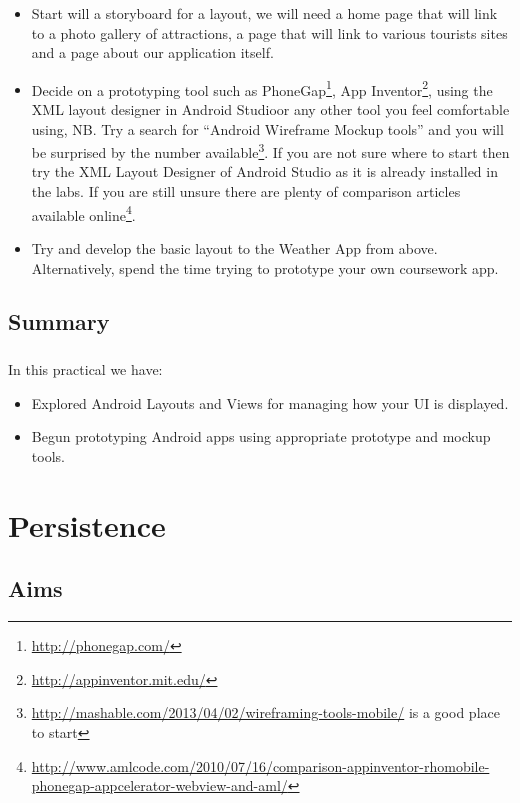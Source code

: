 \documentclass[12pt, a4paper, twoside]{book}
\begin{document}
\begin{itemize}
\item Start will a storyboard for a layout, we will need a home page that will link to a photo gallery of attractions, a page that will link to various tourists sites and a page about our application itself.
\item Decide on a prototyping tool such as PhoneGap\footnote{\url{http://phonegap.com/}}, App Inventor\footnote{\url{http://appinventor.mit.edu/}}, using the XML layout designer in Android Studioor any other tool you feel comfortable using, NB. Try a search for ``Android Wireframe Mockup tools'' and you will be surprised by the number available\footnote{\url{http://mashable.com/2013/04/02/wireframing-tools-mobile/} is a good place to start}. If you are not sure where to start then try the XML Layout Designer of Android Studio as it is already installed in the labs. If you are still unsure there are plenty of comparison articles available online\footnote{\url{http://www.amlcode.com/2010/07/16/comparison-appinventor-rhomobile-phonegap-appcelerator-webview-and-aml/}}.
\item Try and develop the basic layout to the Weather App from above. Alternatively,  spend the time trying to prototype your own coursework app.
\end{itemize}

\section{Summary}
\paragraph{} In this practical we have: 

\begin{itemize}
\item Explored Android Layouts and Views for managing how your UI is displayed.
\item Begun prototyping Android apps using appropriate prototype and mockup tools.
\end{itemize}


\chapter{Persistence}
\section{Aims}
\end{document}
